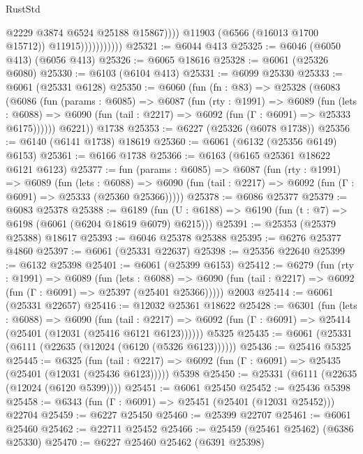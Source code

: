 \begin{lexlean}{RustStd}
\begin{coremodule}
                                  @2229
                                  @3874
                                  @6524
                                  @25188
                                  @15867))))
                          @11903
                          (@6566 (@16013 @1700 @15712))
                          @11915)))))))))))
@25321 := @6044 @413
@25325 := @6046 (@6050 @413) (@6056 @413)
@25326 := @6065 @18616
@25328 := @6061 (@25326 @6080)
@25330 := @6103 (@6104 @413)
@25331 := @6099 @25330
@25333 := @6061 (@25331 @6128)
@25350 := @6060
    (fun (fn : @83) =>
    @25328
      (@6083
        (@6086
          (fun (params : @6085) =>
          @6087
            (fun (rty : @1991) =>
            @6089
              (fun (lets : @6088) =>
              @6090 (fun (tail : @2217) => @6092 (fun (Γ : @6091) => @25333 @6175))))))
        @6221))
    @1738
@25353 := @6227 (@25326 (@6078 @1738))
@25356 := @6140 (@6141 @1738) @18619
@25360 := @6061 (@6132 (@25356 @6149) @6153)
@25361 := @6166 @1738
@25366 := @6163 (@6165 @25361 @18622 @6121 @6123)
@25377 := fun (params : @6085) =>
  @6087
    (fun (rty : @1991) =>
    @6089
      (fun (lets : @6088) =>
      @6090 (fun (tail : @2217) => @6092 (fun (Γ : @6091) => @25333 (@25360 @25366)))))
@25378 := @6086 @25377
@25379 := @6083 @25378
@25388 := @6189
    (fun (U : @6188) => @6190 (fun (t : @7) => @6198 (@6061 (@6204 @18619 @6079) @6215)))
@25391 := @25353 (@25379 @25388) @18617
@25393 := @6046 @25378 @25388
@25395 := @6276 @25377 @4860
@25397 := @6061 (@25331 @22637)
@25398 := @25356 @22640
@25399 := @6132 @25398
@25401 := @6061 (@25399 @6153)
@25412 := @6279
    (fun (rty : @1991) =>
    @6089
      (fun (lets : @6088) =>
      @6090 (fun (tail : @2217) => @6092 (fun (Γ : @6091) => @25397 (@25401 @25366)))))
    @2003
@25414 := @6061 (@25331 @22657)
@25416 := @12032 @25361 @18622
@25428 := @6301
    (fun (lets : @6088) =>
    @6090
      (fun (tail : @2217) =>
      @6092 (fun (Γ : @6091) => @25414 (@25401 (@12031 (@25416 @6121 @6123))))))
    @5325
@25435 := @6061 (@25331 (@6111 (@22635 (@12024 (@6120 (@5326 @6123))))))
@25436 := @25416 @5325
@25445 := @6325
    (fun (tail : @2217) => @6092 (fun (Γ : @6091) => @25435 (@25401 (@12031 (@25436 @6123)))))
    @5398
@25450 := @25331 (@6111 (@22635 (@12024 (@6120 @5399))))
@25451 := @6061 @25450
@25452 := @25436 @5398
@25458 := @6343 (fun (Γ : @6091) => @25451 (@25401 (@12031 @25452))) @22704
@25459 := @6227 @25450
@25460 := @25399 @22707
@25461 := @6061 @25460
@25462 := @22711 @25452
@25466 := @25459 (@25461 @25462) (@6386 @25330)
@25470 := @6227 @25460 @25462 (@6391 @25398)

\end{coremodule}
\end{lexlean}

